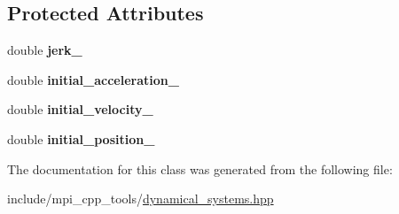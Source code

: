 \subsection*{Protected Attributes}
\begin{DoxyCompactItemize}
\item 
double {\bfseries jerk\+\_\+}\hypertarget{classmct_1_1LinearDynamics_aa12a81e1ef4e33e310bf02978a20fef4}{}\label{classmct_1_1LinearDynamics_aa12a81e1ef4e33e310bf02978a20fef4}

\item 
double {\bfseries initial\+\_\+acceleration\+\_\+}\hypertarget{classmct_1_1LinearDynamics_aa37dc8e527de707c9402b3de06e7e35f}{}\label{classmct_1_1LinearDynamics_aa37dc8e527de707c9402b3de06e7e35f}

\item 
double {\bfseries initial\+\_\+velocity\+\_\+}\hypertarget{classmct_1_1LinearDynamics_ab9db51c5442ac30a82f10fa33b3a024d}{}\label{classmct_1_1LinearDynamics_ab9db51c5442ac30a82f10fa33b3a024d}

\item 
double {\bfseries initial\+\_\+position\+\_\+}\hypertarget{classmct_1_1LinearDynamics_a4ab9e657e985729091d3136f98bb99fd}{}\label{classmct_1_1LinearDynamics_a4ab9e657e985729091d3136f98bb99fd}

\end{DoxyCompactItemize}


The documentation for this class was generated from the following file\+:\begin{DoxyCompactItemize}
\item 
include/mpi\+\_\+cpp\+\_\+tools/\hyperlink{dynamical__systems_8hpp}{dynamical\+\_\+systems.\+hpp}\end{DoxyCompactItemize}
